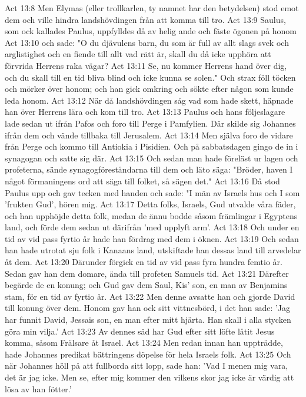 Act 13:8  Men Elymas (eller trollkarlen, ty namnet har den betydelsen) stod emot dem och ville hindra landshövdingen från att komma till tro.
Act 13:9  Saulus, som ock kallades Paulus, uppfylldes då av helig ande och fäste ögonen på honom
Act 13:10  och sade: "O du djävulens barn, du som är full av allt slags svek och arglistighet och en fiende till allt vad rätt är, skall du då icke upphöra att förvrida Herrens raka vägar?
Act 13:11  Se, nu kommer Herrens hand över dig, och du skall till en tid bliva blind och icke kunna se solen." Och strax föll töcken och mörker över honom; och han gick omkring och sökte efter någon som kunde leda honom.
Act 13:12  När då landshövdingen såg vad som hade skett, häpnade han över Herrens lära och kom till tro.
Act 13:13  Paulus och hans följeslagare lade sedan ut ifrån Pafos och foro till Perge i Pamfylien. Där skilde sig Johannes ifrån dem och vände tillbaka till Jerusalem.
Act 13:14  Men själva foro de vidare från Perge och kommo till Antiokia i Pisidien. Och på sabbatsdagen gingo de in i synagogan och satte sig där.
Act 13:15  Och sedan man hade föreläst ur lagen och profeterna, sände synagogföreståndarna till dem och läto säga: "Bröder, haven I något förmaningens ord att säga till folket, så sägen det."
Act 13:16  Då stod Paulus upp och gav tecken med handen och sade: "I män av Israels hus och I som 'frukten Gud', hören mig.
Act 13:17  Detta folks, Israels, Gud utvalde våra fäder, och han upphöjde detta folk, medan de ännu bodde såsom främlingar i Egyptens land, och förde dem sedan ut därifrån 'med upplyft arm'.
Act 13:18  Och under en tid av vid pass fyrtio år hade han fördrag med dem i öknen.
Act 13:19  Och sedan han hade utrotat sju folk i Kanaans land, utskiftade han dessas land till arvedelar åt dem.
Act 13:20  Därunder förgick en tid av vid pass fyra hundra femtio år. Sedan gav han dem domare, ända till profeten Samuels tid.
Act 13:21  Därefter begärde de en konung; och Gud gav dem Saul, Kis' son, en man av Benjamins stam, för en tid av fyrtio år.
Act 13:22  Men denne avsatte han och gjorde David till konung över dem. Honom gav han ock sitt vittnesbörd, i det han sade: 'Jag har funnit David, Jessais son, en man efter mitt hjärta. Han skall i alla stycken göra min vilja.'
Act 13:23  Av dennes säd har Gud efter sitt löfte låtit Jesus komma, såsom Frälsare åt Israel.
Act 13:24  Men redan innan han uppträdde, hade Johannes predikat bättringens döpelse för hela Israels folk.
Act 13:25  Och när Johannes höll på att fullborda sitt lopp, sade han: 'Vad I menen mig vara, det är jag icke. Men se, efter mig kommer den vilkens skor jag icke är värdig att lösa av han fötter.'
